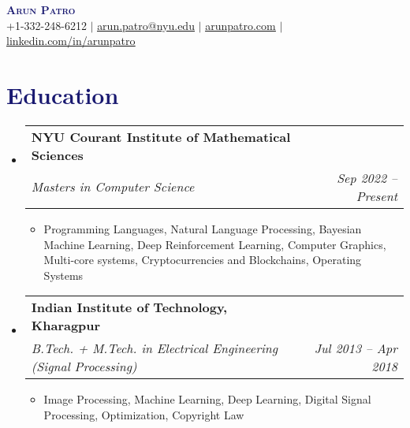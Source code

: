 \documentclass[letterpaper,10.7pt]{article}
\makeatletter
\newcommand{\resumeItem}[1]{
  \item\small{
    {#1 \vspace{-2pt}}
  }
}
\newcommand{\resumeSubheading}[4]{
  \vspace{-2pt}\item
    \begin{tabular*}{1.0\textwidth}[t]{l@{\extracolsep{\fill}}r}
      \textbf{#1} & \small #2 \\
      \textit{\small#3} & \textit{\small #4} \\
    \end{tabular*}\vspace{-7pt}
}
\newcommand{\resumeSubHeadingListStart}{\begin{itemize}[leftmargin=0.0in, label={}]}
\newcommand{\resumeSubHeadingListEnd}{\end{itemize}}
\newcommand{\resumeItemListStart}{\begin{itemize}}
\newcommand{\resumeItemListEnd}{\end{itemize}\vspace{-5pt}}
\makeatother
\begin{document}

\begin{center}
  \textbf{\LARGE \scshape \textcolor{MidnightBlue}{Arun Patro}} \\ \vspace{1pt}
  \small +1-332-248-6212 $|$ \href{mailto:arun.patro@nyu.edu}{\underline{arun.patro@nyu.edu}} $|$
  \href{https://www.arunpatro.com}{\underline{arunpatro.com}} $|$
  \href{https://www.linkedin.com/in/arunpatro/}{\underline{linkedin.com/in/arunpatro}
  }
\end{center}


\section{\textcolor{MidnightBlue}{Education}}
\resumeSubHeadingListStart
\resumeSubheading
{NYU Courant Institute of Mathematical Sciences}{}
{Masters in Computer Science}{Sep 2022 -- Present}
\resumeItemListStart
\resumeItem{\small{{\color{MidnightBlue}{Key Courses:}}
Programming Languages, Natural Language Processing, Bayesian Machine Learning, Deep Reinforcement Learning, Computer Graphics, Multi-core systems, Cryptocurrencies and Blockchains, Operating Systems}}
\resumeItemListEnd %
\resumeSubheading
{Indian Institute of Technology, Kharagpur}{}
{B.Tech. + M.Tech. in Electrical Engineering (Signal Processing)}{Jul 2013 -- Apr 2018}
\resumeItemListStart
\resumeItem{\small{{\color{MidnightBlue}{Key Courses:}} Image Processing, Machine Learning, Deep Learning, Digital Signal Processing, Optimization, Copyright Law}}
\resumeItemListEnd \vspace{0.1in}
\resumeSubHeadingListEnd
\end{document}
